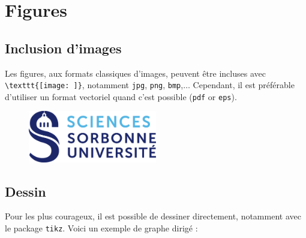 \documentclass[a4paper, 12pt]{report}
\begin{document}
    \section{Figures}
    \subsection{Inclusion d'images}
    Les figures, aux formats classiques d'images, peuvent être incluses avec \verb+\texttt{[image: ]}+, notamment \texttt{jpg}, \texttt{png}, \texttt{bmp},$\dots$ Cependant, il est préférable d'utiliser un format vectoriel quand c'est possible (\texttt{pdf} or \texttt{eps}).

    \begin{figure}[H]
        \centering
        \includegraphics[width=0.5\textwidth]{resources/img/logo_science.png}
        \label{fig:logo-up-mi}
    \end{figure}

    \subsection{Dessin}
    Pour les plus courageux, il est possible de dessiner directement, notamment avec le package \texttt{tikz}. Voici un exemple de graphe dirigé :
    
    \begin{figure}[H]
        \centering
        \label{fig:graphe-dirige}
    \end{figure}
    
\end{document}
